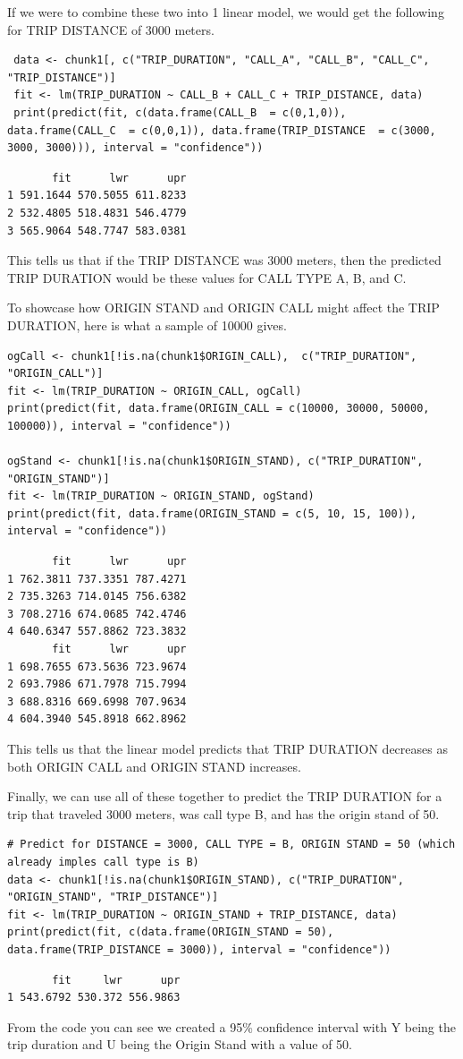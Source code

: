 \documentclass{article}
\numberwithin{equation}{section}
\begin{document}
If we were to combine these two into 1 linear model, we would get the following for TRIP DISTANCE of 3000 meters.
\begin{lstlisting}
 data <- chunk1[, c("TRIP_DURATION", "CALL_A", "CALL_B", "CALL_C", "TRIP_DISTANCE")]
 fit <- lm(TRIP_DURATION ~ CALL_B + CALL_C + TRIP_DISTANCE, data)
 print(predict(fit, c(data.frame(CALL_B  = c(0,1,0)), data.frame(CALL_C  = c(0,0,1)), data.frame(TRIP_DISTANCE  = c(3000, 3000, 3000))), interval = "confidence"))
\end{lstlisting}  
\begin{verbatim}
       fit      lwr      upr
1 591.1644 570.5055 611.8233
2 532.4805 518.4831 546.4779
3 565.9064 548.7747 583.0381
\end{verbatim}
This tells us that if the TRIP DISTANCE was 3000 meters, then the predicted TRIP DURATION would be these values for CALL TYPE A, B, and C.

To showcase how ORIGIN STAND and ORIGIN CALL might affect the TRIP DURATION, here is what a sample of 10000 gives.

\begin{lstlisting}
ogCall <- chunk1[!is.na(chunk1$ORIGIN_CALL),  c("TRIP_DURATION", "ORIGIN_CALL")]
fit <- lm(TRIP_DURATION ~ ORIGIN_CALL, ogCall)
print(predict(fit, data.frame(ORIGIN_CALL = c(10000, 30000, 50000, 100000)), interval = "confidence"))

ogStand <- chunk1[!is.na(chunk1$ORIGIN_STAND), c("TRIP_DURATION", "ORIGIN_STAND")]
fit <- lm(TRIP_DURATION ~ ORIGIN_STAND, ogStand)
print(predict(fit, data.frame(ORIGIN_STAND = c(5, 10, 15, 100)), interval = "confidence"))
\end{lstlisting}  
\begin{verbatim}
       fit      lwr      upr
1 762.3811 737.3351 787.4271
2 735.3263 714.0145 756.6382
3 708.2716 674.0685 742.4746
4 640.6347 557.8862 723.3832
       fit      lwr      upr
1 698.7655 673.5636 723.9674
2 693.7986 671.7978 715.7994
3 688.8316 669.6998 707.9634
4 604.3940 545.8918 662.8962
\end{verbatim}
This tells us that the linear model predicts that TRIP DURATION decreases as both ORIGIN CALL and ORIGIN STAND increases.

Finally, we can use all of these together to predict the TRIP DURATION for a trip that traveled 3000 meters, was call type B, and has the origin stand of 50.

\begin{lstlisting}
# Predict for DISTANCE = 3000, CALL TYPE = B, ORIGIN STAND = 50 (which already imples call type is B)
data <- chunk1[!is.na(chunk1$ORIGIN_STAND), c("TRIP_DURATION", "ORIGIN_STAND", "TRIP_DISTANCE")]
fit <- lm(TRIP_DURATION ~ ORIGIN_STAND + TRIP_DISTANCE, data)
print(predict(fit, c(data.frame(ORIGIN_STAND = 50), data.frame(TRIP_DISTANCE = 3000)), interval = "confidence"))
\end{lstlisting}  
\begin{verbatim}
       fit     lwr      upr
1 543.6792 530.372 556.9863
\end{verbatim}
From the code you can see we created a 95\% confidence interval with Y being the trip duration and U being the Origin Stand with a value of 50. \\
\end{document}
